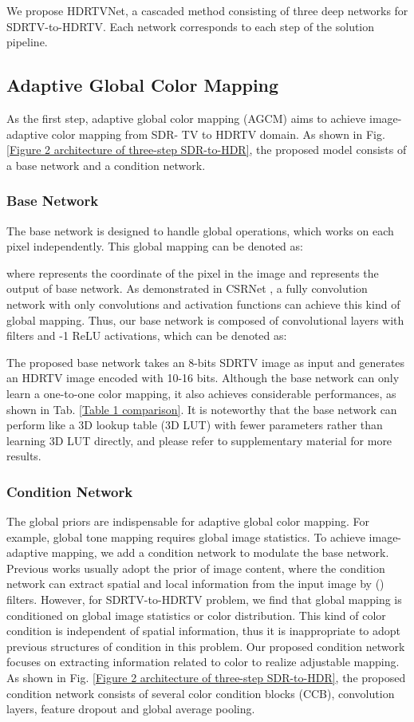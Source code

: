 \documentclass[10pt,twocolumn,letterpaper]{article}
\begin{document}
We propose HDRTVNet, a cascaded method consisting of three deep networks for SDRTV-to-HDRTV. Each network corresponds to each step of the solution pipeline.

\vspace{-4pt}
\subsection{Adaptive Global Color Mapping}
As the first step, adaptive global color mapping (AGCM) aims to achieve image-adaptive color mapping from SDR- TV to HDRTV domain. As shown in Fig. \ref{Figure 2 architecture of three-step SDR-to-HDR}, the proposed model consists of a base network and a condition network.

\subsubsection{Base Network}
The base network is designed to handle global operations, which works on each pixel independently. This global mapping can be denoted as:

where  represents the coordinate of the pixel in the image  and  represents the output of base network. As demonstrated in CSRNet \cite{liu2021very}, a fully convolution network with only  convolutions and activation functions can achieve this kind of global mapping. Thus, our base network is composed of  convolutional layers with  filters and -1 ReLU activations, which can be denoted as:

The proposed base network takes an 8-bits SDRTV image as input and generates an HDRTV image encoded with 10-16 bits. Although the base network can only learn a one-to-one color mapping, it also achieves considerable performances, as shown in Tab. \ref{Table 1 comparison}. It is noteworthy that the base network can perform like a 3D lookup table (3D LUT) with fewer parameters rather than learning 3D LUT directly, and please refer to supplementary material for more results.

\subsubsection{Condition Network}
The global priors are indispensable for adaptive global color mapping. For example, global tone mapping requires global image statistics. To achieve image-adaptive mapping, we add a condition network to modulate the base network. Previous works \cite{wang2018recovering, he2020conditional, chen2021hdrunet} usually adopt the prior of image content, where the condition network can extract spatial and local information from the input image by  () filters. However, for SDRTV-to-HDRTV problem, we find that global mapping is conditioned on global image statistics or color distribution. This kind of color condition is independent of spatial information, thus it is inappropriate to adopt previous structures of condition in this problem. Our proposed condition network focuses on extracting information related to color to realize adjustable mapping. As shown in Fig. \ref{Figure 2 architecture of three-step SDR-to-HDR}, the proposed condition network consists of several color condition blocks (CCB), convolution layers, feature dropout and global average pooling.
\end{document}
